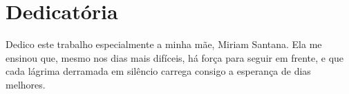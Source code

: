 \chapter*{Dedicatória}
  \vspace*{\fill}
  \noindent
  \hspace{2em}Dedico este trabalho especialmente a minha mãe, Miriam Santana. Ela me ensinou que, mesmo nos dias mais difíceis, há força para seguir em frente, e que cada lágrima derramada em silêncio carrega consigo a esperança de dias melhores.
  \vspace*{\fill}
